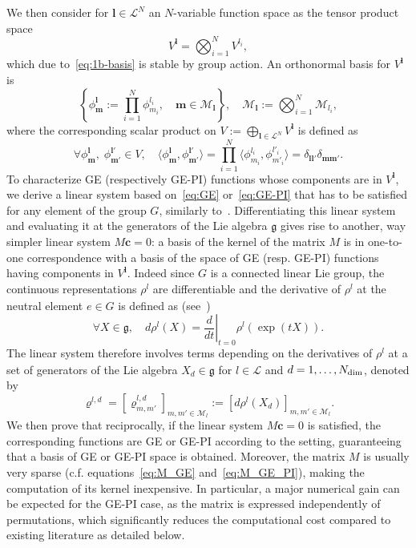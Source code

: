 \documentclass{article}
\newcommand{\vrho}[2]{\varrho^{#1}_{#2}}
\newcommand{\rep}[2]{\rho^{#1}_{#2}}
\newcommand{\dd}{{d}}
\numberwithin{equation}{section}
\def\bc{{\bm c}}
\def\bl{{\bm l}}
\def\bbm{{\bm m}}
\def\calM{\mathcal{M}}
\def\calL{\mathcal{L}}
\def\Nat{{N}}
\begin{document}
We then consider for $\bl \in \calL^\Nat$ an $\Nat$-variable function space as the
tensor product space 
\[
    V^{\bl} = \bigotimes_{i=1}^\Nat V^{l_i},
\]
which due to~\eqref{eq:1b-basis} is stable by group action. 
An orthonormal basis for $V^{\bl}$ is 
\begin{equation}
\label{eq:calMbl}
       \left\{  \phi^\bl_\bbm := \prod_{i=1}^\Nat \phi^{l_i}_{m_i}, \quad \bbm \in \calM_\bl \right\}, \quad  \calM_\bl := \bigotimes_{i=1}^\Nat \calM_{l_i},
\end{equation}
where the corresponding scalar product on $V := \bigoplus_{\bl\in\calL^\Nat} V^{\bl}$ is defined as 
\[
  \forall  \phi^\bl_\bbm, \; \phi^{\bl'}_{\bbm'} \in V,
  \quad \langle \phi^\bl_\bbm, \phi^{\bl'}_{\bbm'} \rangle 
    = \prod_{i=1}^\Nat \langle \phi^{l_i}_{m_i}, \phi^{l'_i}_{m'_i} \rangle =\delta_{\bl\bl'}\delta_{\bbm\bbm'}.
\]
To characterize GE (respectively GE-PI) functions whose components are in $V^{\bl}$, we derive a linear system based on~\eqref{eq:GE} or~\eqref{eq:GE-PI} that has to be satisfied for any element of the group $G$, similarly to~\cite{Batatia2023-us}. 
Differentiating this linear system and evaluating it at the generators of the Lie algebra $\mathfrak g$ gives rise to another, way simpler linear system $M \bc = 0$: 
a basis of the kernel of the matrix $M$ is in one-to-one correspondence with a basis of the space of GE (resp. GE-PI) functions having components in $V^{\bl}$.
Indeed since $G$ is a  connected linear Lie group, the continuous representations $\rep{l}{}$ are differentiable and the derivative of $\rep{l}{}$ at the neutral element $e\in G$ is defined as (see~\cite[Theorem 3.28]{Hall2013-af})
\begin{equation}\label{eq:rep-deriv}
    \forall X\in\mathfrak g,\quad  d\rep{l}{}(X) = \left.\frac{d}{dt}\right|_{t=0} \rep{l}{}(\exp(t  X)).
\end{equation}
The linear system therefore involves terms depending on 
the derivatives of $\rep{l}{}$ at a set of generators of the Lie algebra $X_\dd\in \mathfrak g$ 
for $l \in \calL$ and $d = 1, \ldots, N_{\rm{dim}}$, denoted by
\[
    \vrho{l,\dd}{}=[\vrho{l,\dd}{m,m'}]_{m,m' \in \calM_l}:= [d\rep{l}{}(X_\dd)]_{m,m' \in \calM_l}.
\]
We then prove that reciprocally, if the linear system $M\bc =0$ is satisfied, the corresponding functions are GE or GE-PI according to the setting, guaranteeing that a basis of GE or GE-PI space is obtained. 
Moreover, the matrix $M$ is usually very sparse (c.f. equations~\eqref{eq:M_GE} and~\eqref{eq:M_GE_PI}), making the computation of its kernel inexpensive. In particular, a major numerical gain can be expected for the GE-PI case, as the matrix is expressed independently of permutations, which significantly reduces the computational cost compared to existing literature as detailed below.
\end{document}
